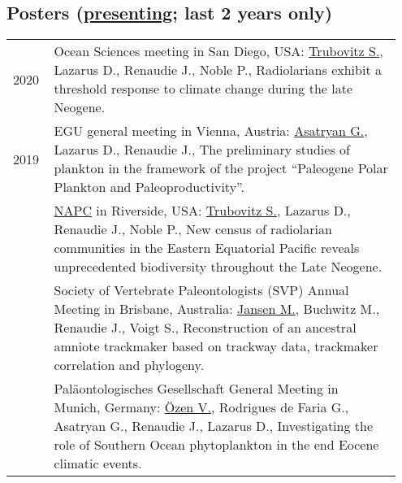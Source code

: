 \documentclass[11pt, a4paper]{article}
\begin{document}
\subsection[Posters]{Posters \textnormal{\footnotesize{(\underline{presenting}; last 2 years only)}}}
\begin{longtable}{p{0.1\linewidth} P{0.85\linewidth}}
2020 & Ocean Sciences meeting in San Diego, USA: \underline{Trubovitz S.}, Lazarus D., Renaudie J., Noble P., Radiolarians exhibit a threshold response to climate change during the late Neogene.\\
2019 & EGU general meeting in Vienna, Austria: \underline{Asatryan G.}, Lazarus D., Renaudie J., The preliminary studies of plankton in the framework of the project ``Paleogene Polar Plankton and Paleoproductivity''.\\
& \href{https://escholarship.org/uc/item/6r18f8wn}{NAPC} in Riverside, USA: \underline{Trubovitz S.}, Lazarus D., Renaudie J., Noble P., New census of radiolarian communities in the Eastern Equatorial Pacific reveals unprecedented biodiversity throughout the Late Neogene.\\
 & Society of Vertebrate Paleontologists (SVP) Annual Meeting in Brisbane, Australia: \underline{Jansen M.}, Buchwitz M., Renaudie J., Voigt S., Reconstruction of an ancestral amniote trackmaker based on trackway data, trackmaker correlation and phylogeny.\\
 & Paläontologisches Gesellschaft General Meeting in Munich, Germany: \underline{\"{O}zen V.}, Rodrigues de Faria G., Asatryan G., Renaudie J., Lazarus D., Investigating the role of Southern Ocean phytoplankton in the end Eocene climatic events.\\

\end{longtable}
\end{document}
